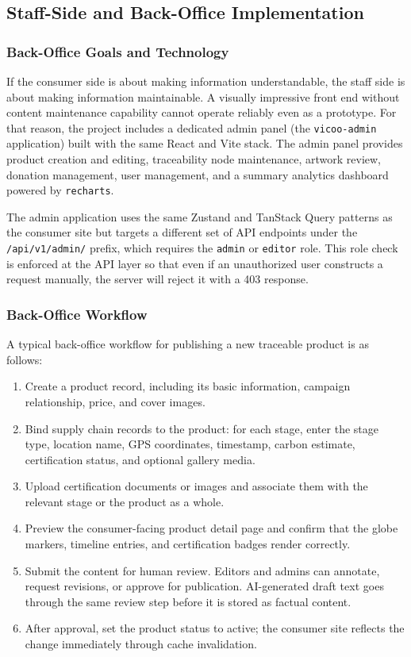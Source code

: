 \documentclass[11pt]{article}
\begin{document}
\subsection{Staff-Side and Back-Office Implementation}
\subsubsection{Back-Office Goals and Technology}
If the consumer side is about making information understandable, the staff side is about making information maintainable. A visually impressive front end without content maintenance capability cannot operate reliably even as a prototype. For that reason, the project includes a dedicated admin panel (the \texttt{vicoo-admin} application) built with the same React and Vite stack. The admin panel provides product creation and editing, traceability node maintenance, artwork review, donation management, user management, and a summary analytics dashboard powered by \texttt{recharts}.

The admin application uses the same Zustand and TanStack Query patterns as the consumer site but targets a different set of API endpoints under the \texttt{/api/v1/admin/} prefix, which requires the \texttt{admin} or \texttt{editor} role. This role check is enforced at the API layer so that even if an unauthorized user constructs a request manually, the server will reject it with a 403 response.

\subsubsection{Back-Office Workflow}
A typical back-office workflow for publishing a new traceable product is as follows:
\begin{enumerate}[leftmargin=2.2em]
    \item Create a product record, including its basic information, campaign relationship, price, and cover images.
    \item Bind supply chain records to the product: for each stage, enter the stage type, location name, GPS coordinates, timestamp, carbon estimate, certification status, and optional gallery media.
    \item Upload certification documents or images and associate them with the relevant stage or the product as a whole.
    \item Preview the consumer-facing product detail page and confirm that the globe markers, timeline entries, and certification badges render correctly.
    \item Submit the content for human review. Editors and admins can annotate, request revisions, or approve for publication. AI-generated draft text goes through the same review step before it is stored as factual content.
    \item After approval, set the product status to active; the consumer site reflects the change immediately through cache invalidation.
\end{enumerate}
\end{document}
